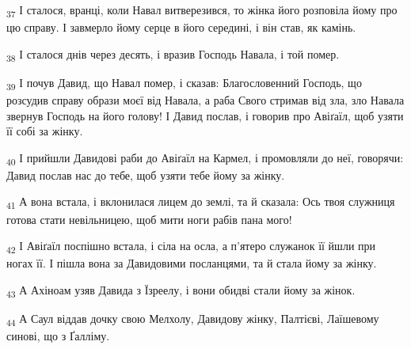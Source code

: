 \begin{tcolorbox}
\textsubscript{37} І сталося, вранці, коли Навал витверезився, то жінка його розповіла йому про цю справу. І завмерло йому серце в його середині, і він став, як камінь.
\end{tcolorbox}
\begin{tcolorbox}
\textsubscript{38} І сталося днів через десять, і вразив Господь Навала, і той помер.
\end{tcolorbox}
\begin{tcolorbox}
\textsubscript{39} І почув Давид, що Навал помер, і сказав: Благословенний Господь, що розсудив справу образи моєї від Навала, а раба Свого стримав від зла, зло Навала звернув Господь на його голову! І Давид послав, і говорив про Авіґаїл, щоб узяти її собі за жінку.
\end{tcolorbox}
\begin{tcolorbox}
\textsubscript{40} І прийшли Давидові раби до Авіґаїл на Кармел, і промовляли до неї, говорячи: Давид послав нас до тебе, щоб узяти тебе йому за жінку.
\end{tcolorbox}
\begin{tcolorbox}
\textsubscript{41} А вона встала, і вклонилася лицем до землі, та й сказала: Ось твоя служниця готова стати невільницею, щоб мити ноги рабів пана мого!
\end{tcolorbox}
\begin{tcolorbox}
\textsubscript{42} І Авіґаїл поспішно встала, і сіла на осла, а п'ятеро служанок її йшли при ногах її. І пішла вона за Давидовими посланцями, та й стала йому за жінку.
\end{tcolorbox}
\begin{tcolorbox}
\textsubscript{43} А Ахіноам узяв Давида з Їзреелу, і вони обидві стали йому за жінок.
\end{tcolorbox}
\begin{tcolorbox}
\textsubscript{44} А Саул віддав дочку свою Мелхолу, Давидову жінку, Палтієві, Лаїшевому синові, що з Ґалліму.
\end{tcolorbox}

